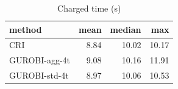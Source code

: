 \begin{table}[htbp]
\centering
\small
\caption{Charged time (s)}
\label{tab:E7_gurobi_threads_b10_time}
\begin{tabular}{lrrr}
\toprule
method & mean & median & max \\
\midrule
CRI & 8.84 & 10.02 & 10.17 \\
GUROBI-agg-4t & 9.08 & 10.16 & 11.91 \\
GUROBI-std-4t & 8.97 & 10.06 & 10.53 \\
\bottomrule
\end{tabular}
\end{table}
